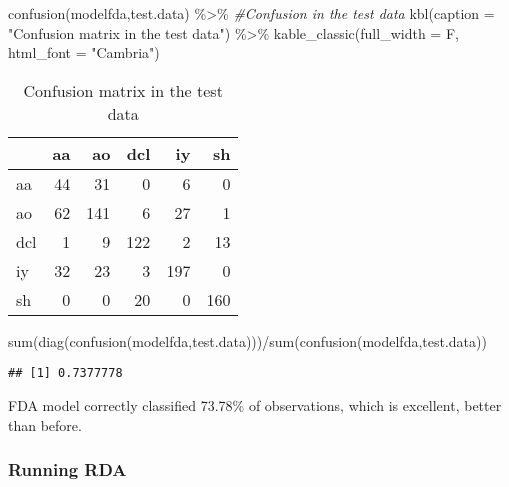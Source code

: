 \documentclass[
]{article}
\newenvironment{Shaded}{\begin{snugshade}}{\end{snugshade}}
\newcommand{\AttributeTok}[1]{\textcolor[rgb]{0.77,0.63,0.00}{#1}}
\newcommand{\CommentTok}[1]{\textcolor[rgb]{0.56,0.35,0.01}{\textit{#1}}}
\newcommand{\FunctionTok}[1]{\textcolor[rgb]{0.00,0.00,0.00}{#1}}
\newcommand{\NormalTok}[1]{#1}
\newcommand{\SpecialCharTok}[1]{\textcolor[rgb]{0.00,0.00,0.00}{#1}}
\newcommand{\StringTok}[1]{\textcolor[rgb]{0.31,0.60,0.02}{#1}}
\begin{document}
\begin{Shaded}
\begin{Highlighting}[]
\FunctionTok{confusion}\NormalTok{(modelfda,test.data) }\SpecialCharTok{\%\textgreater{}\%} \CommentTok{\#Confusion in the test data }
  \FunctionTok{kbl}\NormalTok{(}\AttributeTok{caption =} \StringTok{"Confusion matrix in the test data"}\NormalTok{) }\SpecialCharTok{\%\textgreater{}\%}
  \FunctionTok{kable\_classic}\NormalTok{(}\AttributeTok{full\_width =}\NormalTok{ F, }\AttributeTok{html\_font =} \StringTok{"Cambria"}\NormalTok{)}
\end{Highlighting}
\end{Shaded}

\begin{table}

\caption{\label{tab:unnamed-chunk-35}Confusion matrix in the test data}
\centering
\begin{tabular}[t]{l|r|r|r|r|r}
\hline
  & aa & ao & dcl & iy & sh\\
\hline
aa & 44 & 31 & 0 & 6 & 0\\
\hline
ao & 62 & 141 & 6 & 27 & 1\\
\hline
dcl & 1 & 9 & 122 & 2 & 13\\
\hline
iy & 32 & 23 & 3 & 197 & 0\\
\hline
sh & 0 & 0 & 20 & 0 & 160\\
\hline
\end{tabular}
\end{table}

\begin{Shaded}
\begin{Highlighting}[]
\FunctionTok{sum}\NormalTok{(}\FunctionTok{diag}\NormalTok{(}\FunctionTok{confusion}\NormalTok{(modelfda,test.data)))}\SpecialCharTok{/}\FunctionTok{sum}\NormalTok{(}\FunctionTok{confusion}\NormalTok{(modelfda,test.data))}
\end{Highlighting}
\end{Shaded}

\begin{verbatim}
## [1] 0.7377778
\end{verbatim}

FDA model correctly classified 73.78\% of observations, which is
excellent, better than before.

\hypertarget{running-rda}{%
\subsubsection{Running RDA}\label{running-rda}}
\end{document}
